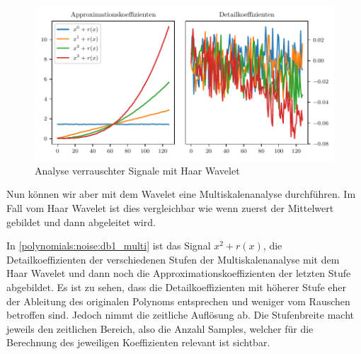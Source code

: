 \begin{refsection}
\begin{figure}
    \centering
    \includegraphics{papers/polynomials/images/polynomials_noise_db1.pdf}
    \caption{Analyse verrauschter Signale mit Haar Wavelet\label{polynomials:noise:db1}}
\end{figure}

Nun können wir aber mit dem Wavelet eine Multiskalenanalyse durchführen. Im
Fall vom Haar Wavelet ist dies vergleichbar wie wenn zuerst der Mittelwert
gebildet und dann abgeleitet wird.

In \autoref{polynomials:noise:db1_multi} ist das Signal $x^2 + r(x)$, die
Detailkoeffizienten der verschiedenen Stufen der Multiskalenanalyse mit dem
Haar Wavelet und dann noch die Approximationskoeffizienten der letzten Stufe
abgebildet. Es ist zu sehen, dass die Detailkoeffizienten mit höherer Stufe
eher der Ableitung des originalen Polynoms entsprechen und weniger vom Rauschen
betroffen sind. Jedoch nimmt die zeitliche Auflösung ab.
Die Stufenbreite macht jeweils den zeitlichen Bereich, also die Anzahl Samples,
welcher für die Berechnung des jeweiligen Koeffizienten relevant ist sichtbar.


\end{refsection}
